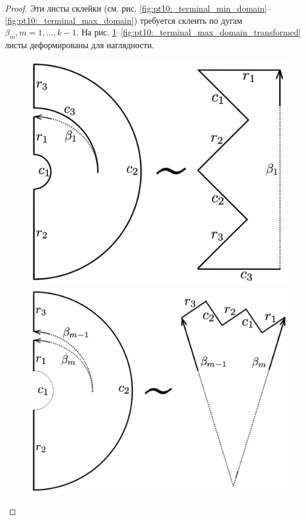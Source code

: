 \begin{proof}
Эти листы склейки (см. рис.  \ref{fig:pt10:_terminal_min_domain}--\ref{fig:pt10:_terminal_max_domain}) требуется склеить по дугам $\beta_m, m=1, \ldots, k-1$.
На рис. \ref{fig:pt10:_terminal_min_domain_transformed}--\ref{fig:pt10:_terminal_max_domain_transformed} листы деформированы для наглядности.
\begin{figure}[!htb]
\centering
\includegraphics[scale=0.1]{images/ch4/section3_circular/atoms/branching/terminal_min_transformed.pdf}
\caption{}
    \label{fig:pt10:_terminal_min_domain_transformed}
\endminipage\hfill
{}
\centering
\includegraphics[scale=0.1]{images/ch4/section3_circular/atoms/branching/branching_domain_transformed.pdf}

\end{figure}
\end{proof}
